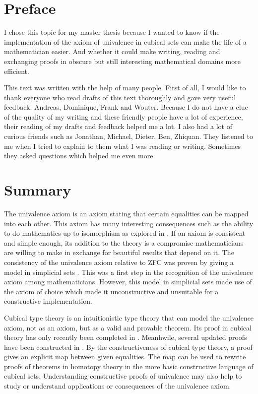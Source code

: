 \documentclass[12pt,a4paper,twoside,xetex,draft]{book}
\begin{document}
\setcounter{page}{0}

\chapter*{Preface}

I chose this topic for my master thesis because I wanted to know if the implementation of the axiom of univalence in cubical sets can make the life of a mathematician easier. And whether it could make writing, reading and exchanging proofs in obscure but still interesting mathematical domains more efficient.

This text was written with the help of many people. First of all, I would like to thank everyone who read drafts of this text thoroughly and gave very useful feedback: Andreas, Dominique, Frank and Wouter. Because I do not have a clue of the quality of my writing and these friendly people have a lot of experience, their reading of my drafts and feedback helped me a lot. I also had a lot of curious friends such as Jonathan, Michael, Dieter, Ben, Zhiquan.  They listened to me when I tried to explain to them what I was reading or writing. Sometimes they asked questions which helped me even more.

\chapter*{Summary}


The univalence axiom is an axiom stating that certain equalities can be mapped into each other. This axiom has many interesting consequences such as the ability to do mathematics up to isomorphism as explored in \cite{Voevodsky2013}. If an axiom is consistent and simple enough, its addition to the theory is a compromise mathematicians are willing to make in exchange for beautiful results that depend on it. The  consistency of the univalence axiom relative to ZFC was proven by giving a model in simplicial sets \cite{Kapulkin2012}. This was a first step in the recognition of the univalence axiom among mathematicians. However, this model in simplicial sets made use of the axiom of choice which made it unconstructive and unsuitable for a constructive implementation.

Cubical type theory is an intuitionistic type theory that can model the univalence axiom, not as an axiom, but as a valid and provable theorem. Its proof in cubical theory has only recently been completed in \cite{Cohen2016}. Meanhwile, several updated proofs have been constructed in \cite{Sterling2018b, Moertberg2018}. By the constructiveness of cubical type theory, a proof gives an explicit map between given equalities. The map can be used to rewrite proofs of theorems in homotopy theory in the more basic constructive language of cubical sets. Understanding constructive proofs of univalence may also help to study or understand applications or consequences of the univalence axiom.
\end{document}
